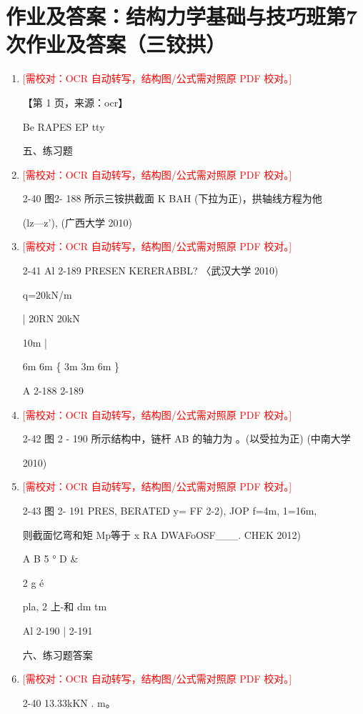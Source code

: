 \documentclass[UTF8,12pt,a4paper,openany]{ctexbook}
\newcommand{\TODO}[1]{\textcolor{red}{[需校对：#1]}}
\begin{document}
\section{作业及答案：结构力学基础与技巧班第7次作业及答案（三铰拱）}
\begin{enumerate}[label=\textbf{\arabic*.},leftmargin=2em]
\item \TODO{OCR 自动转写，结构图/公式需对照原 PDF 校对。}\par 【第 1 页，来源：ocr】\par Be RAPES EP tty\par 五、练习题
\item \TODO{OCR 自动转写，结构图/公式需对照原 PDF 校对。}\par 2-40 图2- 188 所示三铵拱截面 K BAH       (下拉为正)，拱轴线方程为他\par (lz—z’), (广西大学 2010)
\item \TODO{OCR 自动转写，结构图/公式需对照原 PDF 校对。}\par 2-41 Al 2-189 PRESEN KERERABBL? 〈武汉大学 2010)\par q=20kN/m\par |                 20RN    20kN\par 10m          |\par 6m            6m      \{   3m   3m       6m       \}\par A 2-188 2-189
\item \TODO{OCR 自动转写，结构图/公式需对照原 PDF 校对。}\par 2-42 图 2 - 190 所示结构中，链杆 AB 的轴力为          。(以受拉为正) (中南大学\par 2010)
\item \TODO{OCR 自动转写，结构图/公式需对照原 PDF 校对。}\par 2-43 图 2- 191 PRES, BERATED y= FF 2-2), JOP f=4m, 1=16m,\par 则截面忆弯和矩 Mp等于 x RA DWAFoOSF\_\_\_. CHEK 2012)\par A                    B       5                         °           D           \&\par 2                                            g é\par pla, 2                 上-和 dm tm\par Al 2-190                                     |         2-191\par 六、练习题答案
\item \TODO{OCR 自动转写，结构图/公式需对照原 PDF 校对。}\par 2-40 13.33kKN . m。

\end{enumerate}
\end{document}
